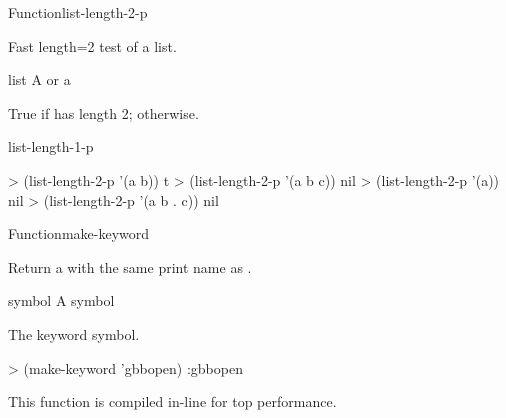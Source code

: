 \documentclass[10pt,twoside,english,pdftex]{article}
\newcommand{\inline}{This function is compiled in-line for top performance.}
\begin{document}

\begin{functiondoc}{Function}{list-length-2-p}%
  { \returns{} }
%
%

\fnsyntax

\fnpurpose Fast length=2 test of a list.

\fnpackage {}

\fnmodule {}

\fnargs
\begin{args}{list}
\arg[list] A  or a 
\end{args}

\fnreturns True if  has length 2; \nil{} otherwise.

\begin{alsos}{list-length-1-p}
\end{alsos}

\fnexamples
\begin{example}
> (list-length-2-p '(a b))
t
> (list-length-2-p '(a b c))
nil
> (list-length-2-p '(a))
nil
> (list-length-2-p '(a b . c))
nil
\end{example}

\end{functiondoc}


\begin{functiondoc}{Function}{make-keyword}{ \returns{}
    } 
%
%
  
\fnsyntax

\fnpurpose Return a  with the same print name
  as .

\fnpackage {}

\fnmodule {}

\fnargs
\begin{args}{symbol}
\arg[symbol] A symbol
\end{args}

\fnreturns The keyword symbol.

\fnexample
\begin{example}
> (make-keyword 'gbbopen)
:gbbopen
\end{example}

\fnnotes \inline

\end{functiondoc}
\end{document}
